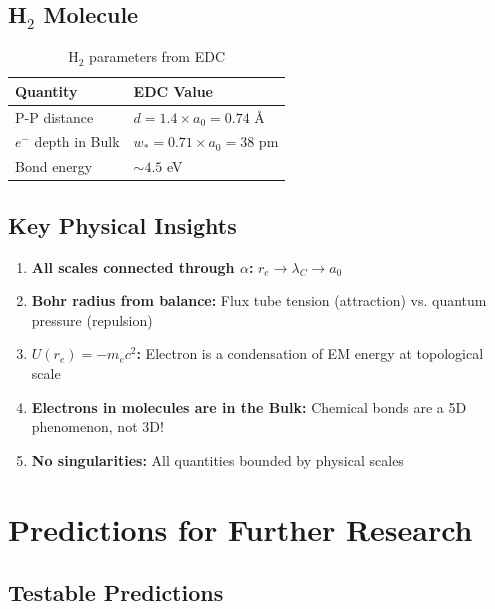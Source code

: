 \documentclass[12pt,a4paper]{article}
\begin{document}
\subsection{H$_2$ Molecule}

\begin{table}[h]
\centering
\begin{tabular}{@{}ll@{}}
\toprule
\textbf{Quantity} & \textbf{EDC Value} \\
\midrule
P-P distance & $d = 1.4 \times a_0 = 0.74$ \AA \\
$e^-$ depth in Bulk & $w_* = 0.71 \times a_0 = 38$ pm \\
Bond energy & $\sim 4.5$ eV \\
\bottomrule
\end{tabular}
\caption{H$_2$ parameters from EDC}
\end{table}

\subsection{Key Physical Insights}

\begin{enumerate}
    \item \textbf{All scales connected through $\alpha$:} $r_e \to \lambda_C \to a_0$
    
    \item \textbf{Bohr radius from balance:} Flux tube tension (attraction) vs. quantum pressure (repulsion)
    
    \item \textbf{$U(r_e) = -m_e c^2$:} Electron is a condensation of EM energy at topological scale
    
    \item \textbf{Electrons in molecules are in the Bulk:} Chemical bonds are a 5D phenomenon, not 3D!
    
    \item \textbf{No singularities:} All quantities bounded by physical scales
\end{enumerate}

\section{Predictions for Further Research}

\subsection{Testable Predictions}
\end{document}

